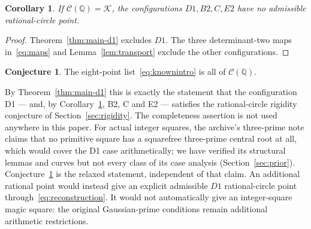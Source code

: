 \documentclass[11pt,letterpaper]{article}
\newtheorem{corollary}[theorem]{Corollary}
\theoremstyle{definition}\newtheorem{definition}[theorem]{Definition}
\newtheorem{conjecture}[theorem]{Conjecture}
\theoremstyle{remark}\newtheorem{remark}[theorem]{Remark}
\newcommand{\Q}{\mathbb Q}\newcommand{\Z}{\mathbb Z}\newcommand{\R}{\mathbb R}
\begin{document}
\begin{corollary}\label{cor:fourtargets}
If $\mathcal C(\Q)=\mathcal K$, the configurations $D1,B2,C,E2$ have no admissible rational-circle point.
\end{corollary}
\begin{proof}
Theorem~\ref{thm:main-d1} excludes $D1$. The three determinant-two maps in~\eqref{eq:maps} and Lemma~\ref{lem:transport} exclude the other configurations.
\end{proof}

\begin{conjecture}\label{conj:points}
The eight-point list~\eqref{eq:knownintro} is all of $\mathcal C(\Q)$.
\end{conjecture}
By Theorem~\ref{thm:main-d1} this is exactly the statement that the configuration D1 — and, by Corollary~\ref{cor:fourtargets}, B2, C and E2 — satisfies the rational-circle rigidity conjecture of Section~\ref{sec:rigidity}. The completeness assertion is not used anywhere in this paper. For actual integer squares, the archive's three-prime note claims that no primitive square has a squarefree three-prime central root at all, which would cover the D1 case arithmetically; we have verified its structural lemmas and curves but not every class of its case analysis (Section~\ref{sec:prior}). Conjecture~\ref{conj:points} is the relaxed statement, independent of that claim. An additional rational point would instead give an explicit admissible $D1$ rational-circle point through~\eqref{eq:reconstruction}. It would not automatically give an integer-square magic square: the original Gaussian-prime conditions remain additional arithmetic restrictions.


\end{document}
